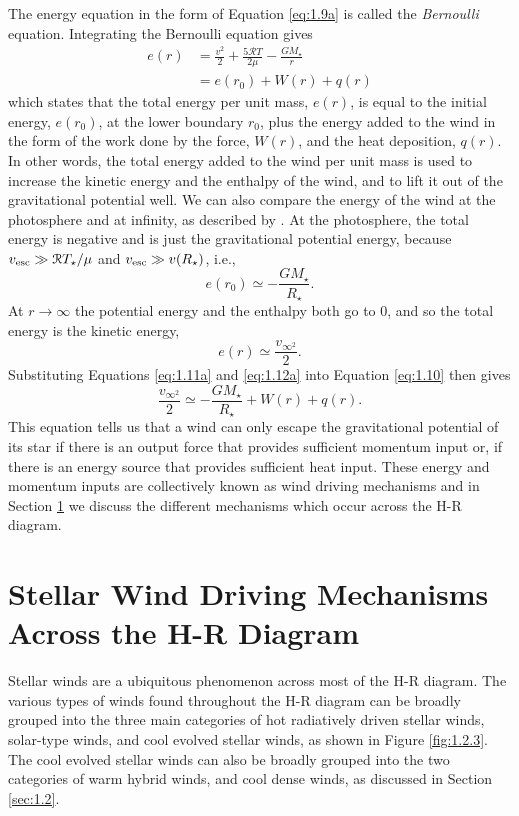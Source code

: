 The energy equation in the form of Equation \ref{eq:1.9a} is called the \textit{Bernoulli} equation. Integrating the Bernoulli equation gives
\begin{align}\label{eq:1.10}
 e(r) &= \frac{v^2}{2} + \frac{5\mathcal{R}T}{2\mu}-\frac{GM_{\star}}{r} \nonumber \\
 & {} =e(r_{0}) + W(r) + q(r)
\end{align}
which states that the total energy per unit mass, $e(r)$, is equal to the initial energy, $e(r_{0})$, at the lower boundary $r_{0}$, plus the energy added to the wind in the form of the work done by the force, $W(r)$, and the heat deposition, $q(r)$. In other words, the total energy added to the wind per unit mass is used to increase the kinetic energy and the enthalpy of the wind, and to lift it out of the gravitational potential well. We can also compare the energy of the wind at the photosphere and at infinity, as described by \cite{lamers_1998}. At the photosphere, the total energy is negative and is just the gravitational potential energy, because $v_{\rm{esc}} \gg \mathcal{R}T_{\star}/\mu$ and  $v_{\rm{esc}} \gg v(R_{\star})$, i.e.,
\begin{equation}\label{eq:1.11a} 
e(r_{0}) \simeq -\frac{GM_{\star}}{R_{\star}}.
\end{equation}
At $r\rightarrow \infty$ the potential energy and the enthalpy both go to 0, and so the total energy is the kinetic energy,
\begin{equation}\label{eq:1.12a} 
e(r) \simeq \frac{v_{\infty ^2}}{2}.
\end{equation}
Substituting Equations \ref{eq:1.11a} and \ref{eq:1.12a} into Equation \ref{eq:1.10} then gives
\begin{equation}
\frac{v_{\infty ^2}}{2} \simeq -\frac{GM_{\star}}{R_{\star}} + W(r) + q(r).
\end{equation}
This equation tells us that a wind can only escape the gravitational potential of its star if there is an output force that provides sufficient momentum input or, if there is an energy source that provides sufficient heat input. These energy and momentum inputs are collectively known as wind driving mechanisms and in Section \ref{sec:1.4} we discuss the different mechanisms which occur across the H-R diagram.

\section{Stellar Wind Driving Mechanisms Across the H-R Diagram}\label{sec:1.4}
Stellar winds are a ubiquitous phenomenon across most of the H-R diagram. The various types of winds found throughout the H-R diagram can be broadly grouped into the three main categories of hot radiatively driven stellar winds, solar-type winds, and cool evolved stellar winds, as shown in Figure \ref{fig:1.2.3}. The cool evolved stellar winds can also be broadly grouped into the two categories of warm hybrid winds, and cool dense winds, as discussed in Section \ref{sec:1.2}. 

